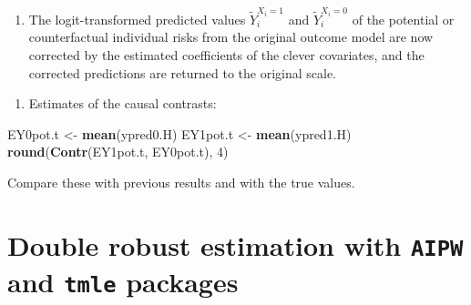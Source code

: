 \documentclass[
]{book}
\newenvironment{Shaded}{\begin{snugshade}}{\end{snugshade}}
\newcommand{\DecValTok}[1]{\textcolor[rgb]{0.00,0.00,0.81}{#1}}
\newcommand{\FunctionTok}[1]{\textcolor[rgb]{0.13,0.29,0.53}{\textbf{#1}}}
\newcommand{\NormalTok}[1]{#1}
\newcommand{\OtherTok}[1]{\textcolor[rgb]{0.56,0.35,0.01}{#1}}
\newcommand{\SpecialCharTok}[1]{\textcolor[rgb]{0.81,0.36,0.00}{\textbf{#1}}}
\providecommand{\tightlist}{%
  \setlength{\itemsep}{0pt}\setlength{\parskip}{0pt}}
\begin{document}
\begin{enumerate}
\def\labelenumi{\arabic{enumi}.}
\setcounter{enumi}{2}
\tightlist
\item
  The logit-transformed predicted values \(\widetilde{Y}_i^{X_i=1}\) and
  \(\widetilde{Y}_i^{X_i=0}\) of
  the potential or counterfactual individual risks from
  the original outcome model are now corrected by the estimated
  coefficients of the clever covariates, and the corrected
  predictions are returned to the original scale.
\end{enumerate}

\begin{Shaded}
\end{Shaded}

\begin{enumerate}
\def\labelenumi{\arabic{enumi}.}
\setcounter{enumi}{3}
\tightlist
\item
  Estimates of the causal contrasts:
\end{enumerate}

\begin{Shaded}
\begin{Highlighting}[]
\NormalTok{EY0pot.t }\OtherTok{\textless{}{-}} \FunctionTok{mean}\NormalTok{(ypred0.H)}
\NormalTok{EY1pot.t }\OtherTok{\textless{}{-}} \FunctionTok{mean}\NormalTok{(ypred1.H)}
\FunctionTok{round}\NormalTok{(}\FunctionTok{Contr}\NormalTok{(EY1pot.t, EY0pot.t), }\DecValTok{4}\NormalTok{)}
\end{Highlighting}
\end{Shaded}

Compare these with previous results and with the true values.

\section{\texorpdfstring{Double robust estimation with \texttt{AIPW} and \texttt{tmle} packages}{Double robust estimation with AIPW and tmle packages}}\label{double-robust-estimation-with-aipw-and-tmle-packages}
\end{document}
